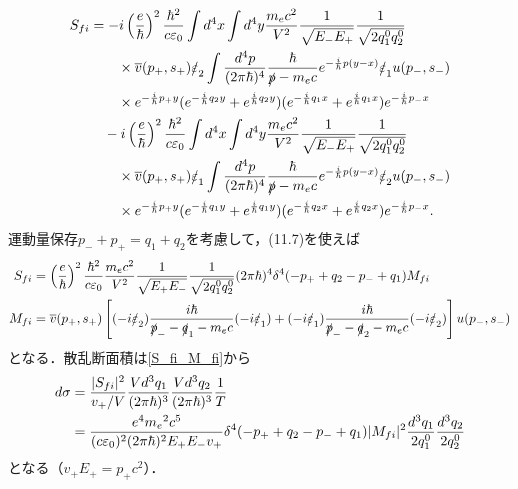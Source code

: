\begin{align}
  \begin{split}
    S_{fi} &= -i\left(\frac{e}{\hbar}\right)^2\frac{\hbar^2}{c\varepsilon_0}\int d^4x\int d^4y \frac{m_ec^2}{V^2} \frac{1}{\sqrt{E_-E_+}} \frac{1}{\sqrt{2q_1^0q_2^0}} \\
    &\qquad \times \overline{v}(p_+,s_+)\slashed{\varepsilon}_2\int \frac{d^4p}{(2\pi\hbar)^4} \frac{\hbar}{\slashed{p}-m_ec} e^{-\frac{i}{\hbar}p(y-x)} \slashed{\varepsilon}_1 u(p_-,s_-) \\
    &\qquad \times e^{-\frac{i}{\hbar}p_+y}(e^{-\frac{i}{\hbar}q_2y}+e^{\frac{i}{\hbar}q_2y})(e^{-\frac{i}{\hbar}q_1x}+e^{\frac{i}{\hbar}q_1x})e^{-\frac{i}{\hbar}p_-x}\\
    &\quad -i\left(\frac{e}{\hbar}\right)^2\frac{\hbar^2}{c\varepsilon_0}\int d^4x\int d^4y \frac{m_ec^2}{V^2} \frac{1}{\sqrt{E_-E_+}} \frac{1}{\sqrt{2q_1^0q_2^0}} \\
    &\qquad \times \overline{v}(p_+,s_+)\slashed{\varepsilon}_1\int \frac{d^4p}{(2\pi\hbar)^4} \frac{\hbar}{\slashed{p}-m_ec} e^{-\frac{i}{\hbar}p(y-x)} \slashed{\varepsilon}_2 u(p_-,s_-) \\
    &\qquad \times e^{-\frac{i}{\hbar}p_+y}(e^{-\frac{i}{\hbar}q_1y}+e^{\frac{i}{\hbar}q_1y})(e^{-\frac{i}{\hbar}q_2x}+e^{\frac{i}{\hbar}q_2x})e^{-\frac{i}{\hbar}p_-x}.
  \end{split}
\end{align}
運動量保存$p_- + p_+ = q_1 + q_2$を考慮して，(11.7)を使えば
\begin{align}
  S_{fi} &= \left(\frac{e}{\hbar}\right)^2\frac{\hbar^2}{c\varepsilon_0} \frac{m_ec^2}{V^2} \frac{1}{\sqrt{E_+E_-}} \frac{1}{\sqrt{2q_1^0q_2^0}} (2\pi\hbar)^4 \delta^4(-p_+ + q_2 - p_- + q_1) M_{fi} \label{S_fi_M_fi} \\
  M_{fi} &= \overline{v}(p_+,s_+)\left[(-i\slashed{\varepsilon}_2) \frac{i\hbar}{\slashed{p}_- - \slashed{q}_1 - m_ec} (-i\slashed{\varepsilon}_1) + (-i\slashed{\varepsilon}_1) \frac{i\hbar}{\slashed{p}_- - \slashed{q}_2 - m_ec} (-i\slashed{\varepsilon}_2) \right] u(p_-,s_-)\label{M_fi}
\end{align}
となる．散乱断面積は\eqref{S_fi_M_fi}から
\begin{align}
  d\sigma &= \frac{\lvert S_{fi}\rvert^2}{v_+/V}\frac{Vd^3q_1}{(2\pi\hbar)^3} \frac{Vd^3q_2}{(2\pi\hbar)^3} \frac{1}{T}\notag\\
  &= \frac{e^4m_e{}^2c^5}{(c\varepsilon_0)^2 (2\pi\hbar)^2 E_+E_-v_+} \delta^4(-p_+ + q_2 - p_- + q_1) \lvert M_{fi}\rvert^2 \frac{d^3q_1}{2q_1^0} \frac{d^3q_2}{2q_2^0}\label{d_sigma}
\end{align}
となる（$v_+E_+=p_+c^2$）．


